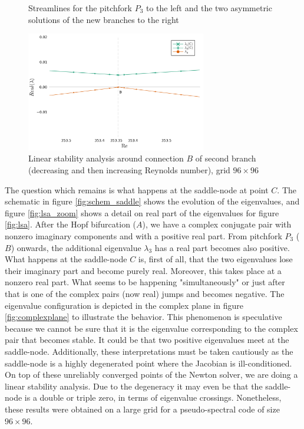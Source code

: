 \begin{figure}[h!]
\begin{subfigure}[b]{0.33\textwidth}
\end{subfigure}
\caption{Streamlines for the pitchfork $P_3$ to the left and the two asymmetric
  solutions of the new branches to the right}
\label{fig:sol_branch2}
\end{figure}

\begin{figure}[h!]
  \centering
  \includegraphics[width=0.7\textwidth]{figs/lsa_sn_branch2_zoom96x96.png}
  \caption{Linear stability analysis around connection $B$ of second branch
  (decreasing and then increasing Reynolds number), grid $96 \times 96$}
  \label{fig:lsa_branch2}
\end{figure}

The question which remains is what happens at the saddle-node at point $C$. The
schematic in figure \ref{fig:schem_saddle} shows the evolution of the
eigenvalues, and figure \ref{fig:lsa_zoom} shows a detail on real part of the
eigenvalues for figure \ref{fig:lsa}. After the Hopf bifurcation ($A$), we have
a complex conjugate pair with nonzero imaginary components and with a positive
real part. From pitchfork $P_3$ ($B$) onwards, the additional eigenvalue
$\lambda_3$ has a real part becomes also positive. What happens at the
saddle-node $C$ is, first of all, that the two eigenvalues lose their imaginary
part and become purely real. Moreover, this takes place at a nonzero real part.
What seems to be happening "simultaneously" or just after that is one of the
complex pairs (now real) jumps and becomes negative. The eigenvalue
configuration is depicted in the complex plane in figure \ref{fig:complexplane}
to illustrate the behavior. This phenomenon is speculative because we cannot be
sure that it is the eigenvalue corresponding to the complex pair that becomes
stable. It could be that two positive eigenvalues meet at the saddle-node.
Additionally, these interpretations must be taken cautiously as the saddle-node
is a highly degenerated point where the Jacobian is ill-conditioned. On top of
these unreliably converged points of the Newton solver, we are doing a linear
stability analysis. Due to the degeneracy it may even be that the saddle-node
is a double or triple zero, in terms of eigenvalue crossings. Nonetheless,
these results were obtained on a large grid for a pseudo-spectral code of size
$96 \times 96$.


